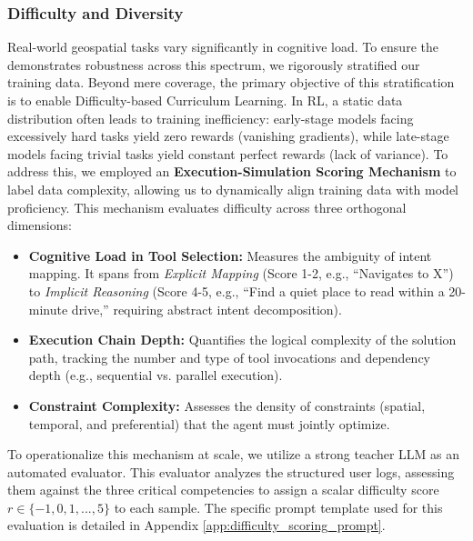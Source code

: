 \subsubsection{Difficulty and Diversity}
Real-world geospatial tasks vary significantly in cognitive load. To ensure the \model demonstrates robustness across this spectrum, we rigorously stratified our training data. Beyond mere coverage, the primary objective of this stratification is to enable Difficulty-based Curriculum Learning. In RL, a static data distribution often leads to training inefficiency: early-stage models facing excessively hard tasks yield zero rewards (vanishing gradients), while late-stage models facing trivial tasks yield constant perfect rewards (lack of variance). To address this, we employed an \textbf{Execution-Simulation Scoring Mechanism} to label data complexity, allowing us to dynamically align training data with model proficiency. This mechanism evaluates difficulty across three orthogonal dimensions:

\begin{itemize}
\item \textbf{Cognitive Load in Tool Selection:} Measures the ambiguity of intent mapping. It spans from \textit{Explicit Mapping} (Score 1-2, e.g., ``Navigates to X'') to \textit{Implicit Reasoning} (Score 4-5, e.g., ``Find a quiet place to read within a 20-minute drive,'' requiring abstract intent decomposition). 
\item \textbf{Execution Chain Depth:} Quantifies the logical complexity of the solution path, tracking the number and type of tool invocations and dependency depth (e.g., sequential vs. parallel execution). 
\item \textbf{Constraint Complexity:} Assesses the density of constraints (spatial, temporal, and preferential) that the agent must jointly optimize. 
\end{itemize}

To operationalize this mechanism at scale, we utilize a strong teacher LLM as an automated evaluator. This evaluator analyzes the structured user logs, assessing them against the three critical competencies to assign a scalar difficulty score $r \in \{-1, 0, 1, ..., 5\}$ to each sample. The specific prompt template used for this evaluation is detailed in Appendix \ref{app:difficulty_scoring_prompt}.

